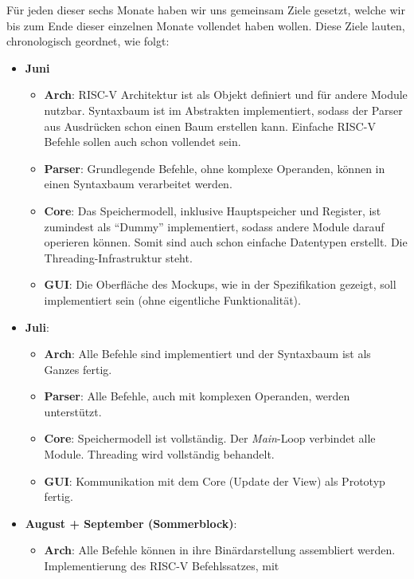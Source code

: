 Für jeden dieser sechs Monate haben wir uns gemeinsam Ziele gesetzt, welche wir
bis zum Ende dieser einzelnen Monate vollendet haben wollen. Diese Ziele lauten,
chronologisch geordnet, wie folgt:

\begin{itemize}
  \item \textbf{Juni}
     \begin{itemize}
     \item \textbf{Arch}: RISC-V Architektur ist als Objekt definiert und für
       andere Module nutzbar. Syntaxbaum ist im Abstrakten implementiert, sodass
       der Parser aus Ausdrücken schon einen Baum erstellen kann. Einfache
       RISC-V Befehle sollen auch schon vollendet sein.
     \item \textbf{Parser}: Grundlegende Befehle, ohne komplexe Operanden,
       können in einen Syntaxbaum verarbeitet werden.
     \item \textbf{Core}: Das Speichermodell, inklusive Hauptspeicher und
       Register, ist zumindest als ``Dummy'' implementiert, sodass andere Module
       darauf operieren können. Somit sind auch schon einfache Datentypen
       erstellt. Die Threading-Infrastruktur steht.
     \item \textbf{GUI}: Die Oberfläche des Mockups, wie in der Spezifikation
       gezeigt, soll implementiert sein (ohne eigentliche Funktionalität).
     \end{itemize}
  \item \textbf{Juli}:
    \begin{itemize}
      \item \textbf{Arch}: Alle Befehle sind implementiert und der Syntaxbaum
        ist als Ganzes fertig.
      \item \textbf{Parser}: Alle Befehle, auch mit komplexen Operanden, werden unterstützt.
      \item \textbf{Core}: Speichermodell ist vollständig. Der \emph{Main}-Loop
        verbindet alle Module. Threading wird vollständig behandelt.
      \item \textbf{GUI}: Kommunikation mit dem Core (Update der View) als
        Prototyp fertig.
    \end{itemize}
  \item \textbf{August + September (Sommerblock)}:
    \begin{itemize}
      \item \textbf{Arch}: Alle Befehle können in ihre Binärdarstellung
        assembliert werden. Implementierung des RISC-V Befehlssatzes, mit

\end{itemize}
\end{itemize}
